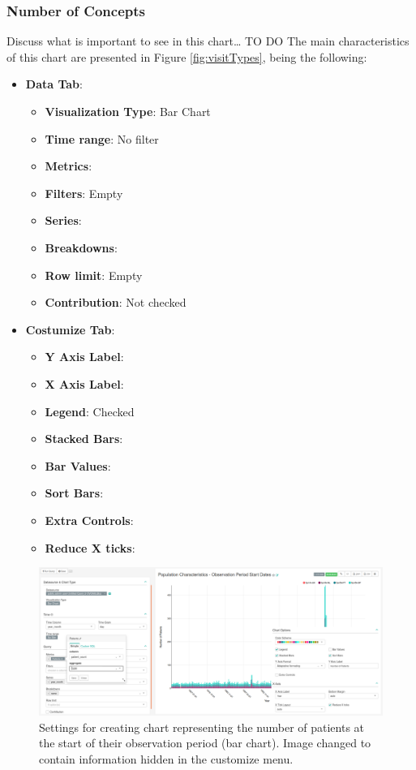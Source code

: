 \documentclass[]{book}
\providecommand{\tightlist}{%
  \setlength{\itemsep}{0pt}\setlength{\parskip}{0pt}}
\begin{document}
\subsubsection{Number of Concepts}\label{number-of-concepts}

Discuss what is important to see in this chart\ldots{} TO DO The main
characteristics of this chart are presented in Figure
\ref{fig:visitTypes}, being the following:

\begin{itemize}
\tightlist
\item
  \textbf{Data Tab}:

  \begin{itemize}
  \tightlist
  \item
    \textbf{Visualization Type}: Bar Chart
  \item
    \textbf{Time range}: No filter
  \item
    \textbf{Metrics}:
  \item
    \textbf{Filters}: Empty
  \item
    \textbf{Series}:
  \item
    \textbf{Breakdowns}:
  \item
    \textbf{Row limit}: Empty
  \item
    \textbf{Contribution}: Not checked
  \end{itemize}
\item
  \textbf{Costumize Tab}:

  \begin{itemize}
  \tightlist
  \item
    \textbf{Y Axis Label}:
  \item
    \textbf{X Axis Label}:
  \item
    \textbf{Legend}: Checked
  \item
    \textbf{Stacked Bars}:
  \item
    \textbf{Bar Values}:
  \item
    \textbf{Sort Bars}:
  \item
    \textbf{Extra Controls}:
  \item
    \textbf{Reduce X ticks}:
  \end{itemize}
\end{itemize}

\begin{figure}
\includegraphics[width=1\linewidth]{images/populationCharacteristicsObservationPeriodStartDates} \caption{Settings for creating chart representing the number of patients at the start of their observation period (bar chart). Image changed to contain information hidden in the customize menu.}\label{fig:visitTypes8}
\end{figure}
\end{document}
